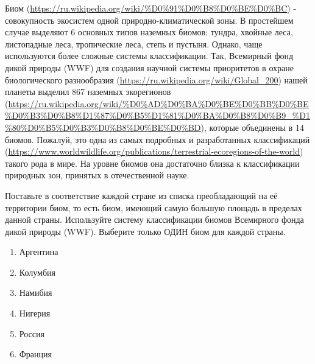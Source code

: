
Биом (\url{https://ru.wikipedia.org/wiki/%D0%91%D0%B8%D0%BE%D0%BC}) - совокупность экосистем одной природно-климатической зоны. В простейшем случае выделяют 6 
основных типов наземных биомов: тундра, хвойные леса, листопадные леса, тропические леса, 
степь и пустыня. Однако, чаще используются более сложные системы классификации. Так, 
Всемирный фонд дикой природы (WWF) для создания научной системы приоритетов в охране 
биологического разнообразия (\url{https://ru.wikipedia.org/wiki/Global_200}) нашей планеты выделил 867 наземных экорегионов (\url{https://ru.wikipedia.org/wiki/%D0%AD%D0%BA%D0%BE%D0%BB%D0%BE%D0%B3%D0%B8%D1%87%D0%B5%D1%81%D0%BA%D0%B8%D0%B9_%D1%80%D0%B5%D0%B3%D0%B8%D0%BE%D0}\linebreak \url{%BD}), которые объединены в 14 биомов. 
Пожалуй, это одна из самых подробных и разработанных классификаций (\url{https://www.worldwildlife.org/publications/terrestrial-ecoregions-of-the-world}) такого рода в мире. На уровне биомов она достаточно близка к классификации природных зон, принятых в отечественной науке.

Поставьте в соответствие каждой стране из списка преобладающий на её территории биом, то есть биом, имеющий самую большую площадь в пределах данной страны. Используйте систему классификации биомов Всемирного фонда дикой природы (WWF). Выберите только ОДИН биом для каждой страны.

    \begin{enumerate}
        \item Аргентина
        \item Колумбия
        \item Намибия
        \item Нигерия
        \item Россия
        \item Франция
    \end{enumerate}
    

